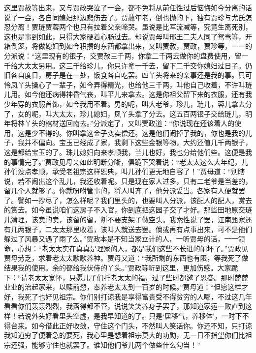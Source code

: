 \begin{parag}
    这里贾赦等出来，又与贾政哭泣了一会，都不免将从前任性过后恼悔如今分离的话说了一会，各自同媳妇那边悲伤去了。贾赦年老，倒也抛的下，独有贾珍与尤氏怎忍分离！贾琏贾蓉两个也只有拉着父亲啼哭。虽说是比军流减等，究竟生离死别，这也是事到如此，只得大家硬着心肠过去。却说贾母叫邢王二夫人同了鸳鸯等，开箱倒笼，将做媳妇到如今积攒的东西都拿出来，又叫贾赦，贾政，贾珍等，一一的分派说：“这里现有的银子，交贾赦三千两，你拿二千两去做你的盘费使用，留一千给大太太另用。这三千给珍儿，你只许拿一千去，留下二千交你媳妇过日子。仍旧各自度日，房子是在一处，饭食各自吃罢。四丫头将来的亲事还是我的事。只可怜凤丫头操心了一辈子，如今弄得精光，也给他三千两，叫他自己收着，不许叫琏儿用。如今他还病得神昏气丧，叫平儿来拿去。这是你祖父留下来的衣服，还有我少年穿的衣服首饰，如今我用不着。男的呢，叫大老爷，珍儿，琏儿，蓉儿拿去分了，女的呢，叫大太太，珍儿媳妇，凤丫头拿了分去。这五百两银子交给琏儿，明年将林丫头的棺材送回南去。”分派定了，又叫贾政道：“你说现在还该着人的使用，这是少不得的。你叫拿这金子变卖偿还。这是他们闹掉了我的，你也是我的儿子，我并不偏向。宝玉已经成了家，我剩下这些金银等物，大约还值几千两银子，这是都给宝玉的了。珠儿媳妇向来孝顺我，兰儿也好，我也分给他们些。这便是我的事情完了。”贾政见母亲如此明断分晰，俱跪下哭着说：“老太太这么大年纪，儿孙们没点孝顺，承受老祖宗这样恩典，叫儿孙们更无地自容了！”贾母道：“别瞎说，若不闹出这个乱儿，我还收着呢。只是现在家人过多，只有二老爷是当差的，留几个人就够了。你就吩咐管事的，将人叫齐了，他分派妥当。各家有人便就罢了。譬如一抄尽了，怎么样呢？我们里头的，也要叫人分派，该配人的配人，赏去的赏去。如今虽说咱们这房子不入官，你到底把这园子交了才好。那些田地原交琏儿清理，该卖的卖，该留的留，断不要支架子做空头。我索性说了罢，江南甄家还有几两银子，二太太那里收着，该叫人就送去罢。倘或再有点事出来，可不是他们躲过了风暴又遇了雨了么。”贾政本是不知当家立计的人，一听贾母的话，一一领命，心想：“老太太实在真真是理家的人，都是我们这些不长进的闹坏了。”贾政见贾母劳乏，求着老太太歇歇养神。贾母又道：“我所剩的东西也有限，等我死了做结果我的使用。余的都给我伏侍的丫头。”贾政等听到这里，更加伤感。大家跪下：“请老太太宽怀，只愿儿子们托老太太的福，过了些时都邀了恩眷。那时兢兢业业的治起家来，以赎前愆，奉养老太太到一百岁的时候。”贾母道：“但愿这样才好，我死了也好见祖宗。你们别打谅我是享得富贵受不得贫穷的人哪，不过这几年看看你们轰轰烈烈，我落得都不管，说说笑笑养身子罢了，那知道家运一败直到这样！若说外头好看里头空虚，是我早知道的了。只是‘居移气，养移体’，一时下不得台来。如今借此正好收敛，守住这个门头，不然叫人笑话你。你还不知，只打谅我知道穷了便着急的要死，我心里是想着祖宗莫大的功勋，无一日不指望你们比祖宗还强，能够守住也就罢了。谁知他们爷儿两个做些什么勾当！”
\end{parag}


